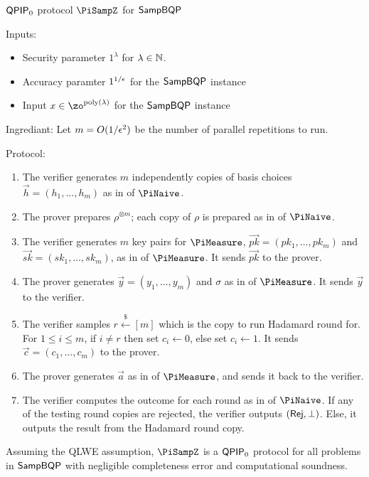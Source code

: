 \begin{protocol}{$\operatorname{\mathsf{QPIP}}_0$ protocol $\PiSampZ$ for $\operatorname{\mathsf{SampBQP}}$}
\label{proto:QPIP0samp}

Inputs:
	\begin{itemize}
		\item Security parameter $1^\lambda$ for $\lambda\in\mathbb{N}$.
		\item Accuracy paramter $1^{1/\epsilon}$ for the $\operatorname{\mathsf{SampBQP}}$ instance
		\item Input $x\in\zo^{\poly(\lambda)}$ for the $\operatorname{\mathsf{SampBQP}}$ instance
	\end{itemize}

Ingrediant: Let $m=O(1/\epsilon^2)$ be the number of parallel repetitions to run.
    
Protocol:
\begin{enumerate}
	\item The verifier generates $m$ independently copies of basis choices $\vec{h}=(h_1,\ldots,h_m)$ as in  of $\PiNaive$.
	\item The prover prepares $\rho^{\otimes m}$; each copy of $\rho$ is prepared as in  of $\PiNaive$.
	\item The verifier generates $m$ key pairs for $\PiMeasure$, $\vec{pk}=(pk_1,\ldots,pk_m)$ and $\vec{sk}=(sk_1,\ldots,sk_m)$, as in  of $\PiMeasure$.
		It sends $\vec{pk}$ to the prover.
	\item The prover generates $\vec{y}=(y_1,\ldots,y_m)$ and $\sigma$ as in  of $\PiMeasure$.
		It sends $\vec{y}$ to the verifier.
	\item The verifier samples $r\xleftarrow{\$}[m]$ which is the copy to run Hadamard round for.
		For $1\leq i\leq m$, if $i\ne r$ then set $c_i\leftarrow 0$, else set $c_i\leftarrow 1$.
		It sends $\vec{c}=(c_1,\ldots,c_m)$ to the prover.
	\item The prover generates $\vec{a}$ as in  of $\PiMeasure$, and sends it back to the verifier.
	\item \label{step:multi-testing}
		The verifier computes the outcome for each round as in  of $\PiNaive$.
		If any of the testing round copies are rejected, the verifier outputs $(\mathsf{Rej}, \bot)$.
		Else, it outputs the result from the Hadamard round copy.
\end{enumerate}
\end{protocol}

\begin{theorem}\label{thm:qpip0}
	Assuming the QLWE assumption, $\PiSampZ$ is a $\operatorname{\mathsf{QPIP}}_0$ protocol for all problems in $\operatorname{\mathsf{SampBQP}}$ with negligible  completeness error and computational soundness. 
\end{theorem}


